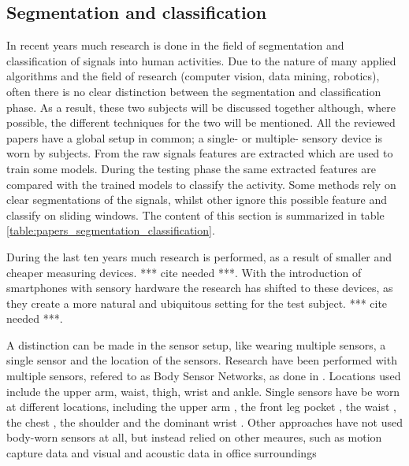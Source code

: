 
\subsection{Segmentation and classification}\label{sec:lit_review_segmentation}
In recent years much research is done in the field of segmentation and classification of signals into human activities.
Due to the nature of many applied algorithms and the field of research (computer vision, data mining, robotics), often there is no clear distinction between the segmentation and classification phase.
As a result, these two subjects will be discussed together although, where possible, the different techniques for the two will be mentioned.
All the reviewed papers have a global setup in common; a single- or multiple- sensory device is worn by subjects.
From the raw signals features are extracted which are used to train some models.
During the testing phase the same extracted features are compared with the trained models to classify the activity.
Some methods rely on clear segmentations of the signals, whilst other ignore this possible feature and classify on sliding windows.
The content of this section is summarized in table \ref{table:papers_segmentation_classification}.

During the last ten years much research is performed, as a result of smaller and cheaper measuring devices. *** cite needed ***.
With the introduction of smartphones with sensory hardware the research has shifted to these devices, as they create a more natural and ubiquitous setting for the test subject. *** cite needed ***.

A distinction can be made in the sensor setup, like wearing multiple sensors, a single sensor and the location of the sensors.
Research have been performed with multiple sensors, refered to as Body Sensor Networks, as done in \cite{guenterberg2009automatic, guenterberg2009distributed, bao2004activity, sherril2005using}.
Locations used include the upper arm, waist, thigh, wrist and ankle.
Single sensors have be worn at different locations, including the upper arm \cite{krause2003unsupervised}, the front leg pocket \cite{kwapisz2011activity, duque2012offline, siirtola2012recognizing, he2009activity}, the waist \cite{ravi2005activity, lester2006practical, lee2178physical}, the chest \cite{ahmed2012non, himberg2001time}, the shoulder \cite{lester2005hybrid} and the dominant wrist \cite{yang2008using, long2009single}.
Other approaches have not used body-worn sensors at all, but instead relied on other meaures, such as motion capture data \cite{barbivc2004segmenting, zhou2008aligned} and visual \cite{perdikis2008recognition} and acoustic data in office surroundings \cite{oliver2002layered}

